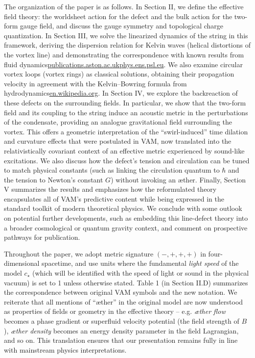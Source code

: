 \documentclass[12pt]{article}
\begin{document}
The organization of the paper is as follows. In Section II, we define the effective field theory: the worldsheet action for the defect and the bulk action for the two-form gauge field, and discuss the gauge symmetry and topological charge quantization. In Section III, we solve the linearized dynamics of the string in this framework, deriving the dispersion relation for Kelvin waves (helical distortions of the vortex line) and demonstrating the correspondence with known results from fluid dynamics\href{https://publications.aston.ac.uk/id/eprint/28756/1/Kelvin_wave_cascade_in_the_vortex_filament_model.pdf#:~:text=relation%20%CF%89,4%CF%80}{publications.aston.ac.uk}\href{https://www.phys.ens.psl.eu/~brachet/files/Publications_&_Reprints_files/5097b266-f35c-4097-8f95-260f190973ce.pdf#:~:text=particular%2C%20note%20that%20in%20the,18%29%20%CE%94vL%20ui}{phys.ens.psl.eu}. We also examine circular vortex loops (vortex rings) as classical solutions, obtaining their propagation velocity in agreement with the Kelvin–Bowring formula from hydrodynamics\href{https://en.wikipedia.org/wiki/Vortex_ring#:~:text=,frac%20%7B1%7D%7B4%7D%7D%5Cright}{en.wikipedia.org}. In Section IV, we explore the backreaction of these defects on the surrounding fields. In particular, we show that the two-form field and its coupling to the string induce an acoustic metric in the perturbations of the condensate, providing an analogue gravitational field surrounding the vortex. This offers a geometric interpretation of the “swirl-induced” time dilation and curvature effects that were postulated in VAM, now translated into the relativistically covariant context of an effective metric experienced by sound-like excitations. We also discuss how the defect’s tension and circulation can be tuned to match physical constants (such as linking the circulation quantum to $\hbar$ and the tension to Newton’s constant $G$) without invoking an æther. Finally, Section V summarizes the results and emphasizes how the reformulated theory encapsulates all of VAM’s predictive content while being expressed in the standard toolkit of modern theoretical physics. We conclude with some outlook on potential further developments, such as embedding this line-defect theory into a broader cosmological or quantum gravity context, and comment on prospective pathways for publication.


Throughout the paper, we adopt metric signature $(-,+,+,+)$ in four-dimensional spacetime, and use units where the fundamental \textit{light speed} of the model $c_\star$ (which will be identified with the speed of light or sound in the physical vacuum) is set to 1 unless otherwise stated. Table 1 (in Section II.D) summarizes the correspondence between original VAM symbols and the new notation. We reiterate that all mentions of “æther” in the original model are now understood as properties of fields or geometry in the effective theory – e.g. \textit{æther flow} becomes a phase gradient or superfluid velocity potential (the field strength of $B$), \textit{æther density} becomes an energy density parameter in the field Lagrangian, and so on. This translation ensures that our presentation remains fully in line with mainstream physics interpretations.
\end{document}
